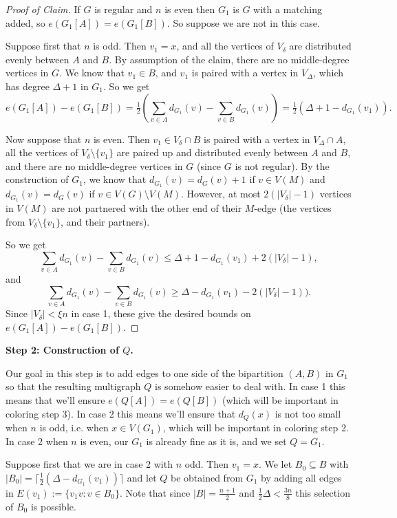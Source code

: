\documentclass[11pt, oneside]{article}
\newenvironment{proofc}{\begin{proof}[Proof of Claim]}{\end{proof}}
\begin{document}
\begin{proofc} If $G$ is regular and $n$ is even then $G_1$ is $G$ with a matching added, so $e(G_1[A])=e(G_1[B])$. So suppose we are not in this case.

Suppose first that $n$ is odd. Then $v_1=x$, and all the vertices of $V_{\delta}$ are distributed evenly between $A$ and $B$. By assumption of the claim, there are no middle-degree vertices in $G$. We know that $v_1\in B$, and $v_1$ is paired with a vertex in $V_\Delta$, which has degree $\Delta+1$ in $G_1$. So we get
 $$
 e(G_1[A]) -e(G_1[B]) =\tfrac{1}{2}\left(\sum_{v\in A}d_{G_1}(v)- \sum_{v\in B}d_{G_1}(v)\right)=\tfrac{1}{2}(\Delta+1-d_{G_1}(v_1)).
 $$


Now suppose that $n$ is even. Then $v_1 \in V_{\delta}\cap B$ is paired with a vertex in $V_{\Delta}\cap A$, all the vertices of $V_{\delta}\setminus \{v_1\}$ are paired up and distributed evenly between $A$ and $B$, and there are no middle-degree vertices in $G$ (since $G$ is not regular). By the construction of $G_1$, we know that $d_{G_1}(v)=d_G(v)+1$ if $v\in V(M)$ and $d_{G_1}(v)=d_G(v)$ if $v\in V(G)\setminus V(M)$.  However, at most 
$2(|V_{\delta}|-1)$ vertices in $V(M)$ are not partnered with the other end of their $M$-edge (the vertices from $V_\delta\setminus \{v_1\}$, and their partners). 

So we get
$$
    \sum_{v\in A} d_{G_1}(v) -\sum_{v\in B} d_{G_1}(v) \le \Delta+1-d_{G_1}(v_1)+ 2(|V_{\delta}|-1),  
$$
 and 
 $$
    \sum_{v\in A} d_{G_1}(v) -\sum_{v\in B} d_{G_1}(v) \ge  \Delta-d_{G_1}(v_1)-2(|V_{\delta}|-1)).  
$$
Since $|V_\delta|< \xi n$ in case 1, these give the desired bounds on $e(G_1[A]) -e(G_1[B])$. 
\end{proofc}

 \vspace*{.1in}

\noindent \textbf{Step 2: Construction of $Q$.}

Our goal in this step is to add edges to one side of the bipartition $(A, B)$ in $G_1$ so that the resulting multigraph $Q$ is somehow easier to deal with. In case 1 this means that we'll ensure $e(Q[A]) = e(Q[B])$ (which will be important in coloring step 3). In case 2 this means we'll ensure that $d_Q(x)$ is not too small when $n$ is odd, i.e. when $x\in V(G_1)$, which will be important in coloring step 2.  In case 2 when $n$ is even, our $G_1$ is already fine as it is, and we set $Q=G_1$.

Suppose first that we are in case 2 with $n$ odd. Then $v_1=x$. We let $B_0\subseteq B$
with $|B_0| = \lceil \frac{1}{2}(\Delta -d_{G_1}(v_1))  \rceil$
and let $Q$ 
be obtained from $G_1$ by adding all edges in $E(v_1):=\{v_1v: v\in B_0\}$.  Note that since $|B|=\tfrac{n+1}{2}$ and $\tfrac{1}{2}\Delta<\tfrac{3n}{8}$ this selection of $B_0$ is possible. 
\end{document}
